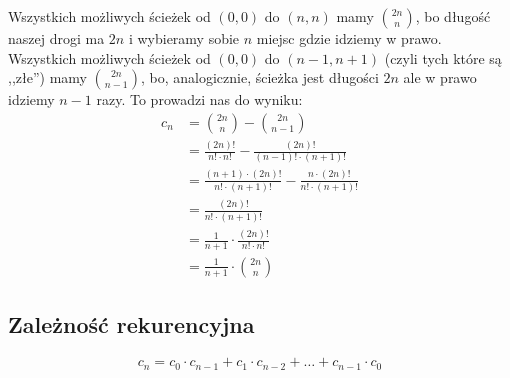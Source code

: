 Wszystkich możliwych ścieżek od $(0,0)$ do $(n,n)$ mamy $\binom{2n}{n}$, bo długość naszej drogi ma $2n$ i wybieramy sobie $n$ miejsc gdzie idziemy w prawo. Wszystkich możliwych ścieżek od $(0,0)$ do $(n-1,n+1)$ (czyli tych które są ,,złe'') mamy $\binom{2n}{n-1}$, bo, analogicznie, ścieżka jest długości $2n$ ale w prawo idziemy $n-1$ razy. To prowadzi nas do wyniku:
\begin{equation*}
	\begin{split}
		c_n
		&= \binom{2n}{n} - \binom{2n}{n-1} \\
		&= \frac{(2n)!}{n! \cdot n!} - \frac{(2n)!}{(n-1)! \cdot (n+1)!} \\
		&= \frac{(n+1) \cdot (2n)!}{n! \cdot (n+1)!} - \frac{n \cdot (2n)!}{n! \cdot (n+1)!}\\
		&= \frac{(2n)!}{n! \cdot (n+1)!} \\
		&= \frac{1}{n+1} \cdot \frac {(2n)!}{n! \cdot n!} \\
		&= \frac{1}{n+1} \cdot \binom{2n}{n}
	\end{split}
\end{equation*}
\subsection{Zależność rekurencyjna}

\begin{theorem}
	\begin{equation}
		c_n = c_{0} \cdot c_{n-1} + c_{1} \cdot c_{n - 2} + \dots + c_{n-1} \cdot c_0
	\end{equation}
\end{theorem}

